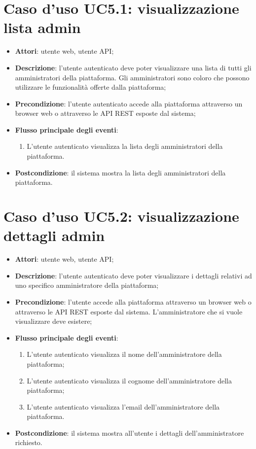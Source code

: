 \section{Caso d'uso UC5.1: visualizzazione lista admin}
\begin{itemize}
\item \textbf{Attori}: utente web, utente API;
\item \textbf{Descrizione}: l'utente autenticato deve poter visualizzare una lista di tutti gli amministratori della piattaforma. Gli amministratori sono coloro che possono utilizzare le funzionalità offerte dalla piattaforma; 
      \item \textbf{Precondizione}: l'utente autenticato accede alla piattaforma attraverso un browser web o attraverso le API REST esposte dal sistema;

        \item \textbf{Flusso principale degli eventi}:
          \begin{enumerate}
          \item L'utente autenticato visualizza la lista degli amministratori della piattaforma.

      \end{enumerate}
    \item \textbf{Postcondizione}: il sistema mostra la lista degli amministratori della piattaforma.
  \end{itemize}
\hypertarget{UC5.2}{}
\section{Caso d'uso UC5.2: visualizzazione dettagli admin}
\begin{itemize}
\item \textbf{Attori}: utente web, utente API;
\item \textbf{Descrizione}: l'utente autenticato deve poter visualizzare i dettagli relativi ad uno specifico amministratore della piattaforma; 
      \item \textbf{Precondizione}: l'utente accede alla piattaforma attraverso un browser web o attraverso le API REST esposte dal sistema. L'amministratore che si vuole visualizzare deve esistere;

        \item \textbf{Flusso principale degli eventi}:
          \begin{enumerate}
          \item L'utente autenticato visualizza il nome dell'amministratore della piattaforma;
          \item L'utente autenticato visualizza il cognome dell'amministratore della piattaforma;
          \item L'utente autenticato visualizza l'email dell'amministratore della piattaforma.

      \end{enumerate}
    \item \textbf{Postcondizione}: il sistema mostra all'utente i dettagli dell'amministratore richiesto.
  \end{itemize}
\hypertarget{UC5.3}{}
